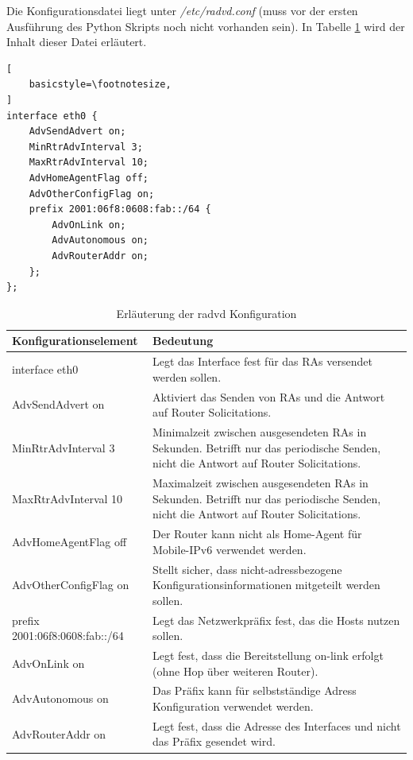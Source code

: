 Die Konfigurationsdatei liegt unter \textit{/etc/radvd.conf} (muss vor der ersten Ausführung des Python Skripts noch nicht vorhanden sein). In Tabelle \ref{tab:radvdConfig} wird der Inhalt dieser Datei erläutert.
\begin{lstlisting}[
	basicstyle=\footnotesize,
]
interface eth0 {
	AdvSendAdvert on;
	MinRtrAdvInterval 3;
	MaxRtrAdvInterval 10;
	AdvHomeAgentFlag off;
	AdvOtherConfigFlag on;
	prefix 2001:06f8:0608:fab::/64 {
		AdvOnLink on;
		AdvAutonomous on;
		AdvRouterAddr on;
	};
};
\end{lstlisting}

\begin{table}
	\centering
		\begin{tabular}{lp{9cm}}
			Konfigurationselement & Bedeutung \\ \hline
			interface eth0 & Legt das Interface fest für das RAs versendet werden sollen. \\
			AdvSendAdvert on & Aktiviert das Senden von RAs und die Antwort auf Router Solicitations. \\
			MinRtrAdvInterval 3 & Minimalzeit zwischen ausgesendeten RAs in Sekunden. Betrifft nur das periodische Senden, nicht die Antwort auf Router Solicitations. \\
			MaxRtrAdvInterval 10 & Maximalzeit zwischen ausgesendeten RAs in Sekunden. Betrifft nur das periodische Senden, nicht die Antwort auf Router Solicitations. \\
			AdvHomeAgentFlag off & Der Router kann nicht als Home-Agent für Mobile-IPv6 verwendet werden. \\
			AdvOtherConfigFlag on & Stellt sicher, dass nicht-adressbezogene Konfigurationsinformationen mitgeteilt werden sollen. \\
			prefix 2001:06f8:0608:fab::/64 & Legt das Netzwerkpräfix fest, das die Hosts nutzen sollen. \\
			AdvOnLink on & Legt fest, dass die Bereitstellung on-link erfolgt (ohne Hop über weiteren Router). \\
			AdvAutonomous on & Das Präfix kann für selbstständige Adress Konfiguration verwendet werden. \\
			AdvRouterAddr on & Legt fest, dass die Adresse des Interfaces und nicht das Präfix gesendet wird.  \\
		\end{tabular}
	\caption{Erläuterung der radvd Konfiguration}
	\label{tab:radvdConfig}
\end{table}
\FloatBarrier

